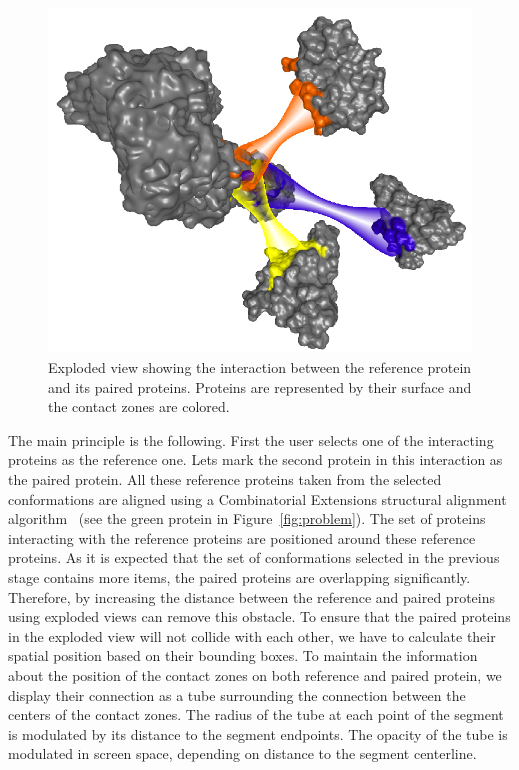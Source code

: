\documentclass[journal]{vgtc}                %
\begin{document}
\begin{figure}[bt]
  \centering
  \includegraphics[width=1.0\columnwidth]{exploded.png}
  \caption{Exploded view showing the interaction between the reference protein and its paired proteins. Proteins are represented by their surface and the contact zones are colored.}
  \label{fig:exploded}
\end{figure}

The main principle is the following.
First the user selects one of the interacting proteins as the reference one.
Lets mark the second protein in this interaction as the paired protein.
All these reference proteins taken from the selected conformations are aligned using a Combinatorial Extensions structural alignment algorithm~\cite{Shindyalov1998} (see the green protein in Figure~\ref{fig:problem}).
The set of proteins interacting with the reference proteins are positioned around these reference proteins.
As it is expected that the set of conformations selected in the previous stage contains more items, the paired proteins are overlapping significantly.
Therefore, by increasing the distance between the reference and paired proteins using exploded views can remove this obstacle.
To ensure that the paired proteins in the exploded view will not collide with each other, we have to calculate their spatial position based on their bounding boxes.
To maintain the information about the position of the contact zones on both reference and paired protein, we display their connection as a tube surrounding the connection between the centers of the contact zones.
The radius of the tube at each point of the segment is modulated by its distance to the segment endpoints.
The opacity of the tube is modulated in screen space, depending on distance to the segment centerline.
\end{document}
